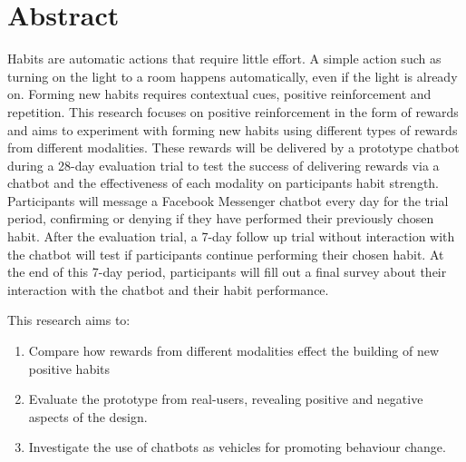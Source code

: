 
\section*{Abstract}
Habits are automatic actions that require little effort. A simple action such as turning on the light to a room happens automatically, even if the light is already on. Forming new habits requires contextual cues, positive reinforcement and repetition. This research focuses on positive reinforcement in the form of rewards and aims to experiment with forming new habits using different types of rewards from different modalities. These rewards will be delivered by a prototype chatbot during a 28-day evaluation trial to test the success of delivering rewards via a chatbot and the effectiveness of each modality on participants habit strength. Participants will message a Facebook Messenger chatbot every day for the trial period, confirming or denying if they have performed their previously chosen habit. After the evaluation trial, a 7-day follow up trial without interaction with the chatbot will test if participants continue performing their chosen habit. At the end of this 7-day period, participants will fill out a final survey about their interaction with the chatbot and their habit performance.

This research aims to:

\begin{enumerate}
  \item Compare how rewards from different modalities effect the building of new positive habits
  \item Evaluate the prototype from real-users, revealing positive and negative aspects of the design.
  \item Investigate the use of chatbots as vehicles for promoting behaviour change.
\end{enumerate}

